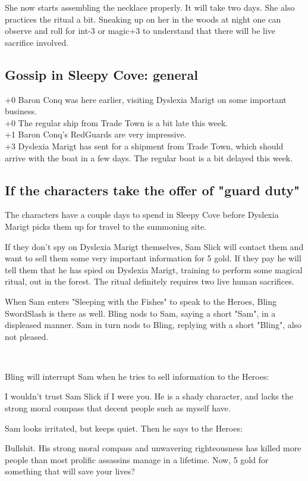 She now starts assembling the necklace properly. It will take two days. She also practices the ritual a bit. Sneaking up on her in the woods at night one can observe and roll for int-3 or magic+3 to understand that there will be live sacrifice involved.


\subsection*{Gossip in Sleepy Cove: general}
+0 Baron Conq was here earlier, visiting Dyslexia Marigt on some important  business. \\
+0 The regular ship from Trade Town is a bit late this week. \\
+1 Baron Conq's RedGuards are very impressive. \\
+3 Dyslexia Marigt has sent for a shipment from Trade Town, which should arrive with the boat in a few days. The regular boat is a bit delayed this week. \\


\subsection*{If the characters take the offer of "guard duty"}
The characters have a couple days to spend in Sleepy Cove before Dyslexia Marigt picks them up for travel to the summoning site.

If they don't spy on Dyslexia Marigt themselves, Sam Slick will contact them and want to sell them some very important information for 5 gold. If they pay he will tell them that he has spied on Dyslexia Marigt, training to perform some magical ritual, out in the forest. The ritual definitely requires two live human sacrifices.

When Sam enters "Sleeping with the Fishes" to speak to the Heroes, Bling SwordSlash is there as well. Bling nods to Sam, saying a short "Sam", in a displeased manner. Sam in turn nods to Bling, replying with a short "Bling", also not pleased.

\

\noindent Bling will interrupt Sam when he tries to sell information to the Heroes:
\begin{readoutloud}
I wouldn't trust Sam Slick if I were you. He is a shady character, and lacks the strong moral compass that decent people such as myself have.
\end{readoutloud}
Sam looks irritated, but keeps quiet. Then he says to the Heroes:
\begin{readoutloud}
Bullshit. His strong moral compass and unwavering righteousness has killed more people than most prolific assassins manage in a lifetime. Now, 5 gold for something that will save your lives?
\end{readoutloud}

